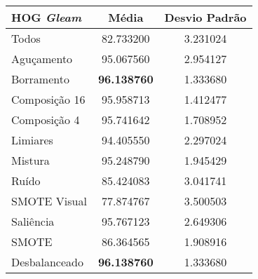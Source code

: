
\begin{table}[!htbp]
\centering
\caption{}
\label{tab:resultados:x:melhor}
\begin{tabular}{|l|c|c|}
\hline
\textbf{HOG \emph{Gleam}} & \textbf{Média}     & \textbf{Desvio Padrão} \\ \hline
   Todos        &  82.733200 &  3.231024  \\ \hline
  Aguçamento    &  95.067560 &  2.954127  \\ \hline
  Borramento    &  \textbf{96.138760} &  1.333680  \\ \hline
  Composição 16 &  95.958713 &  1.412477  \\ \hline
  Composição 4  &  95.741642 &  1.708952  \\ \hline
  Limiares      &  94.405550 &  2.297024  \\ \hline
  Mistura       &  95.248790 &  1.945429  \\ \hline
  Ruído         &  85.424083 &  3.041741  \\ \hline
  SMOTE Visual  &  77.874767 &  3.500503  \\ \hline
  Saliência     &  95.767123 &  2.649306  \\ \hline
 SMOTE          &  86.364565 &  1.908916  \\ \hline
Desbalanceado   &  \textbf{96.138760} &  1.333680  \\ \hline
\end{tabular}
\end{table}

